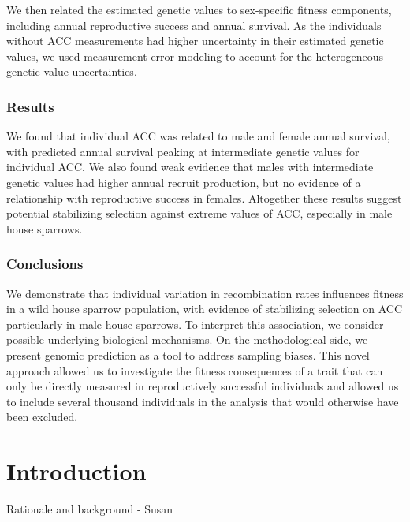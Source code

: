 \documentclass[dvipsnames]{article}
\begin{document}
We then related the estimated genetic values to sex-specific fitness components, including annual reproductive success and annual survival. As the individuals without ACC measurements had higher uncertainty in their estimated genetic values, we used measurement error modeling to account for the heterogeneous genetic value uncertainties. 

\subsubsection*{Results}
We found that individual ACC was related to male and female annual survival, with predicted annual survival peaking at intermediate genetic values for individual ACC. We also found weak evidence that males with intermediate genetic values had higher annual recruit production, but no evidence of a relationship with reproductive success in females. Altogether these results suggest potential stabilizing selection against extreme values of ACC, especially in male house sparrows.

\subsubsection*{Conclusions}
We demonstrate that individual variation in recombination rates influences fitness in a wild house sparrow population, with evidence of stabilizing selection on ACC particularly in male house sparrows. To interpret this association, we consider possible underlying biological mechanisms. On the methodological side, we present genomic prediction as a tool to address sampling biases. This novel approach allowed us to investigate the fitness consequences of a trait that can only be directly measured in reproductively successful individuals and allowed us to include several thousand individuals in the analysis that would otherwise have been excluded.

\section*{Introduction}

Rationale and background - Susan

\end{document}
